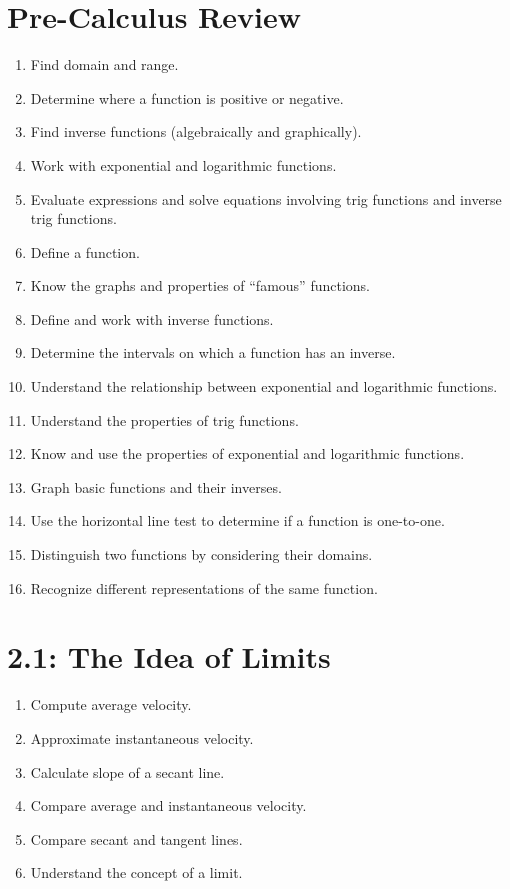 \documentclass[11pt]{article}
\begin{document}
\section*{Pre-Calculus Review}
\begin{enumerate}
	\item Find domain and range.
	\item Determine where a function is positive or negative.
	\item Find inverse functions (algebraically and graphically).
	\item Work with exponential and logarithmic functions.
	\item Evaluate expressions and solve equations involving trig functions and inverse trig functions.
	\item Define a function.
	\item Know the graphs and properties of ``famous'' functions.
	\item Define and work with inverse functions.
	\item Determine the intervals on which a function has an inverse.
	\item Understand the relationship between exponential and logarithmic functions.
	\item Understand the properties of trig functions.
	\item Know and use the properties of exponential and logarithmic functions.
	\item Graph basic functions and their inverses.
	\item Use the horizontal line test to determine if a function is one-to-one.
	\item Distinguish two functions by considering their domains.
	\item Recognize different representations of the same function.
\end{enumerate}


\section*{2.1: The Idea of Limits}
\begin{enumerate}
	\item Compute average velocity.
	\item Approximate instantaneous velocity.
	\item Calculate slope of a secant line.
	\item Compare average and instantaneous velocity.
	\item Compare secant and tangent lines.
	\item Understand the concept of a limit.
\end{enumerate}
\end{document}
